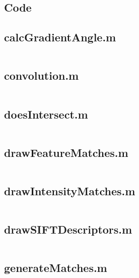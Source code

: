 \documentclass[11pt]{article}
\begin{document}
\newpage
\begin{appendices}

{\color{indigo}
\section{Code}
\label{apdx:code}}
\subsection*{calcGradientAngle.m} \label{sec:calcGradientAngle.m}
\inputminted[breaklines=true,breakanywhere=true,fontsize=\small]{matlab}{../src/calcGradientAngle.m}

\subsection*{\hypertarget{convolution.m}{convolution.m}}
\label{sec:convolution.m}
\inputminted[breaklines=true,breakanywhere=true,fontsize=\small]{matlab}{../src/convolution.m}

\subsection*{\hypertarget{doesIntersect.m}{doesIntersect.m}}
\label{sec:doesIntersect.m}
\inputminted[breaklines=true,breakanywhere=true,fontsize=\small]{matlab}{../src/doesIntersect.m}

\subsection*{drawFeatureMatches.m}
\label{sec:drawFeatureMatches.m}
\inputminted[breaklines=true,breakanywhere=true,fontsize=\small]{matlab}{../src/drawFeatureMatches.m}

\subsection*{drawIntensityMatches.m}
\label{sec:drawIntensityMatches.m}
\inputminted[breaklines=true,breakanywhere=true,fontsize=\small]{matlab}{../src/drawIntensityMatches.m}

\subsection*{drawSIFTDescriptors.m}
\label{sec:drawSIFTDescriptors.m}
\inputminted[breaklines=true,breakanywhere=true,fontsize=\small]{matlab}{../src/drawSIFTDescriptors.m}

\subsection*{generateMatches.m}
\label{sec:generateMatches.m}
\inputminted[breaklines=true,breakanywhere=true,fontsize=\small]{matlab}{../src/generateMatches.m}


\end{appendices}
\end{document}
